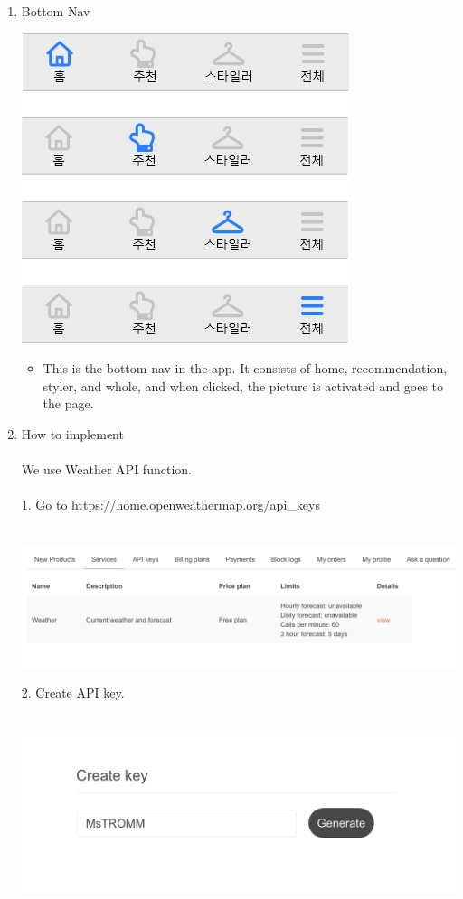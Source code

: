\documentclass[conference]{IEEEtran}
\begin{document}
\begin{enumerate}
 \item Bottom Nav \\ 
 \centerline{\includegraphics[scale=0.45]{assets/하단 nav.jpg}}
 \break
 \begin{itemize}
    \item[] This is the bottom nav in the app. It consists of home, recommendation, styler, and whole, and when clicked, the picture is activated and goes to the page.\\ 
\end{itemize}

\item How to implement \\ \\
    We use Weather API function. \\ \\
    1. Go to https://home.openweathermap.org/api\_keys \\ \\
    \centerline{\includegraphics[scale=0.25]{assets/widget1.png}}
    2. Create API key.\\ \\
    \centerline{\includegraphics[scale=0.45]{assets/widget2.png}}

\end{enumerate}
\end{document}
